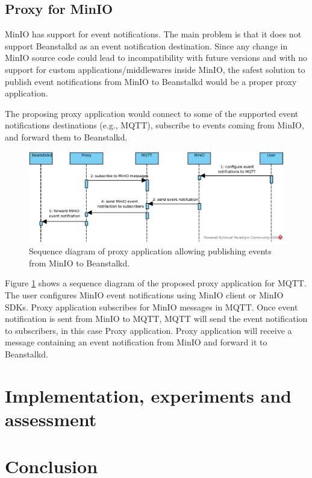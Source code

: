 \section{Proxy for MinIO}
    MinIO has support for event notifications. The main problem is that it does not support Beanstalkd as an event notification destination. Since any change in MinIO source code could lead to incompatibility with future versions and with no support for custom applications/middlewares inside MinIO, the safest solution to publish event notifications from MinIO to Beanstalkd would be a proper proxy application.

    The proposing proxy application would connect to some of the supported event notifications destinations (e.g., MQTT), subscribe to events coming from MinIO, and forward them to Beanstalkd.

    \begin{figure}[hbt]
        \centering
        \includegraphics[width=1\textwidth]{obrazky-figures/minio-proxy.eps}
        \caption{Sequence diagram of proxy application allowing publishing events from MinIO to Beanstalkd.}
        \label{fig:minioProxy}
    \end{figure}

    Figure \ref{fig:minioProxy} shows a sequence diagram of the proposed proxy application for MQTT. The user configures MinIO event notifications using MinIO client or MinIO SDKs. Proxy application subscribes for MinIO messages in MQTT. Once event notification is sent from MinIO to MQTT, MQTT will send the event notification to subscribers, in this case Proxy application. Proxy application will receive a message containing an event notification from MinIO and forward it to Beanstalkd.



\chapter{Implementation, experiments and assessment}

\chapter{Conclusion}

